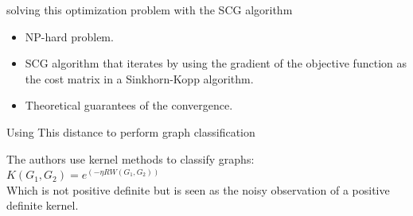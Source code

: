 \documentclass[french]{beamer}
\begin{document}
\begin{frame}{solving this optimization problem with the SCG algorithm}
    \begin{itemize}
        \item NP-hard problem. 
        \item SCG algorithm that iterates by using the gradient of the objective function as the cost matrix in a Sinkhorn-Kopp algorithm.
        \item Theoretical guarantees of the convergence. 
    \end{itemize}
    
\end{frame}

\begin{frame}{Using This distance to perform graph classification}

    The authors use kernel methods to classify graphs:\\[0.3cm]
    $K(G_1, G_2) = e^{(-\eta RW(G_1, G_2))}$\\[0.3cm]

    Which is not positive definite but is seen as the noisy observation of a positive definite kernel.\\[0.3cm]
\end{frame}
\end{document}
